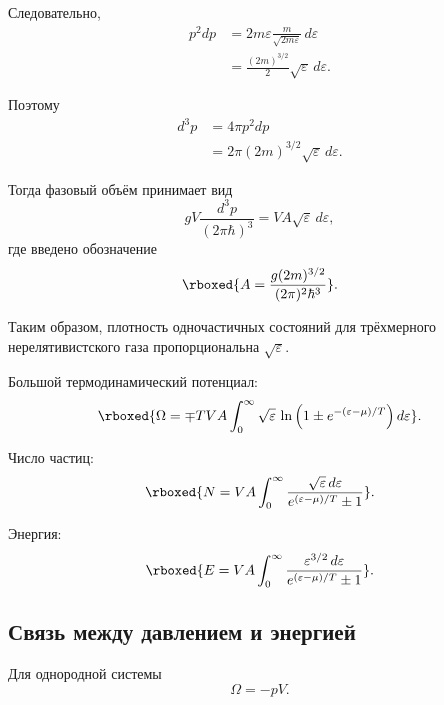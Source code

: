 \documentclass[../final.tex]{subfiles}
\begin{document}
Следовательно,
%
\begin{align*}
    p^2dp
    &=
    2m\varepsilon
    \frac{m}{
        \sqrt{2m\varepsilon}
    }
    \,d\varepsilon
    \\[4pt]
    &=
    \frac{(2m)^{3/2}}{2}
    \sqrt{\varepsilon}\,
    d\varepsilon.
\end{align*}

Поэтому
%
\begin{align*}
    d^3p
    &=
    4\pi p^2dp
    \\[4pt]
    &=
    2\pi
    (2m)^{3/2}
    \sqrt{\varepsilon}\,
    d\varepsilon.
\end{align*}

Тогда фазовый объём принимает вид
%
\begin{equation*}
    gV
    \frac{d^3p}{
        (2\pi\hbar)^3
    }
    =
    VA
    \sqrt{\varepsilon}\,
    d\varepsilon,
\end{equation*}
%
где введено обозначение
%
\[
    \rboxed{
        A
        =
        \frac{
            g(2m)^{3/2}
        }{
            (2\pi)^2\hbar^3
        }
    }.
\]

Таким образом, плотность одночастичных состояний для трёхмерного
нерелятивистского газа пропорциональна $\sqrt{\varepsilon}$.

Большой термодинамический потенциал:
%
\[
    \rboxed{
        \Omega
        =
        \mp TVA
        \int_0^\infty
        \sqrt{\varepsilon}\,
        \ln
        \left(
            1
            \pm
            e^{-(\varepsilon-\mu)/T}
        \right)
        d\varepsilon
    }.
\]

Число частиц:
%
\[
    \rboxed{
        N
        =
        VA
        \int_0^\infty
        \frac{
            \sqrt{\varepsilon}\,
            d\varepsilon
        }{
            e^{(\varepsilon-\mu)/T}\pm1
        }
    }.
\]

Энергия:
%
\[
    \rboxed{
        E
        =
        VA
        \int_0^\infty
        \frac{
            \varepsilon^{3/2}\,
            d\varepsilon
        }{
            e^{(\varepsilon-\mu)/T}\pm1
        }
    }.
\]


\subsection{Связь между давлением и энергией}

Для однородной системы
%
\begin{equation*}
    \Omega
    =
    -pV.
\end{equation*}
\end{document}
